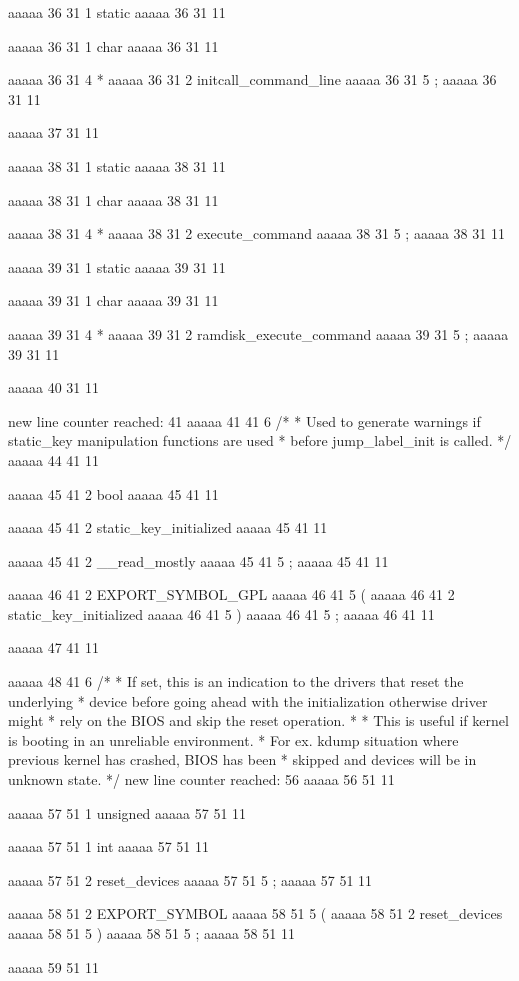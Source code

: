 aaaaa 36 31
1
static
aaaaa 36 31
11
 
aaaaa 36 31
1
char
aaaaa 36 31
11
 
aaaaa 36 31
4
*
aaaaa 36 31
2
initcall_command_line
aaaaa 36 31
5
;
aaaaa 36 31
11


aaaaa 37 31
11


aaaaa 38 31
1
static
aaaaa 38 31
11
 
aaaaa 38 31
1
char
aaaaa 38 31
11
 
aaaaa 38 31
4
*
aaaaa 38 31
2
execute_command
aaaaa 38 31
5
;
aaaaa 38 31
11


aaaaa 39 31
1
static
aaaaa 39 31
11
 
aaaaa 39 31
1
char
aaaaa 39 31
11
 
aaaaa 39 31
4
*
aaaaa 39 31
2
ramdisk_execute_command
aaaaa 39 31
5
;
aaaaa 39 31
11


aaaaa 40 31
11


new line counter reached: 41
aaaaa 41 41
6
/*
 * Used to generate warnings if static_key manipulation functions are used
 * before jump_label_init is called.
 */
aaaaa 44 41
11


aaaaa 45 41
2
bool
aaaaa 45 41
11
 
aaaaa 45 41
2
static_key_initialized
aaaaa 45 41
11
 
aaaaa 45 41
2
__read_mostly
aaaaa 45 41
5
;
aaaaa 45 41
11


aaaaa 46 41
2
EXPORT_SYMBOL_GPL
aaaaa 46 41
5
(
aaaaa 46 41
2
static_key_initialized
aaaaa 46 41
5
)
aaaaa 46 41
5
;
aaaaa 46 41
11


aaaaa 47 41
11


aaaaa 48 41
6
/*
 * If set, this is an indication to the drivers that reset the underlying
 * device before going ahead with the initialization otherwise driver might
 * rely on the BIOS and skip the reset operation.
 *
 * This is useful if kernel is booting in an unreliable environment.
 * For ex. kdump situation where previous kernel has crashed, BIOS has been
 * skipped and devices will be in unknown state.
 */
new line counter reached: 56
aaaaa 56 51
11


aaaaa 57 51
1
unsigned
aaaaa 57 51
11
 
aaaaa 57 51
1
int
aaaaa 57 51
11
 
aaaaa 57 51
2
reset_devices
aaaaa 57 51
5
;
aaaaa 57 51
11


aaaaa 58 51
2
EXPORT_SYMBOL
aaaaa 58 51
5
(
aaaaa 58 51
2
reset_devices
aaaaa 58 51
5
)
aaaaa 58 51
5
;
aaaaa 58 51
11


aaaaa 59 51
11


